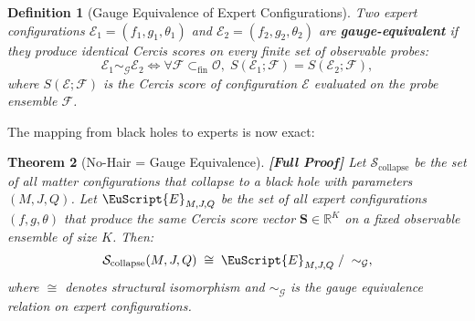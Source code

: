 \documentclass[12pt,a4paper]{article}
\newtheorem{theorem}{Theorem}[section]
\newtheorem{definition}[theorem]{Definition}
\theoremstyle{remark}
\newcommand{\R}{\mathbb{R}}
\newcommand{\F}{\mathcal{F}}
\newcommand{\G}{\mathcal{G}}
\newcommand{\Obs}{\mathcal{O}}
\newcommand{\Sg}{\mathcal{S}}
\newcommand{\ExpertSet}{\EuScript{E}}
\newcommand{\Cercis}{\textsf{Cercis}}
\newcommand{\rigorFull}{\textbf{[Full Proof]}}
\begin{document}
\begin{definition}[Gauge Equivalence of Expert Configurations]
\label{def:expert_gauge}
Two expert configurations $\mathcal{E}_1 = (f_1, g_1, \theta_1)$ and $\mathcal{E}_2 = (f_2, g_2, \theta_2)$ are \textbf{gauge-equivalent} if they produce identical \Cercis{} scores on every finite set of observable probes:
\begin{equation}
  \label{eq:expert_gauge}
  \mathcal{E}_1 \sim_{\G} \mathcal{E}_2 \iff
  \forall \F \subset_{\text{fin}} \Obs,\;
  S(\mathcal{E}_1; \F) = S(\mathcal{E}_2; \F),
\end{equation}
where $S(\mathcal{E}; \F)$ is the \Cercis{} score of configuration $\mathcal{E}$ evaluated on the probe ensemble $\F$.
\end{definition}

The mapping from black holes to experts is now exact:

\begin{theorem}[No-Hair = Gauge Equivalence]
\label{thm:nohair_gauge}
\rigorFull
Let $\Sg_{\text{collapse}}$ be the set of all matter configurations that collapse to a black hole with parameters $(M, J, Q)$. Let $\ExpertSet_{M,J,Q}$ be the set of all expert configurations $(f, g, \theta)$ that produce the same \Cercis{} score vector $\mathbf{S} \in \R^K$ on a fixed observable ensemble of size $K$. Then:
\begin{equation}
  \label{eq:nohair_exact}
  \Sg_{\text{collapse}}(M, J, Q) \;\cong\;
  \ExpertSet_{M,J,Q} \;/\; \sim_{\G},
\end{equation}
where $\cong$ denotes structural isomorphism and $\sim_{\G}$ is the gauge equivalence relation on expert configurations.
\end{theorem}
\end{document}
